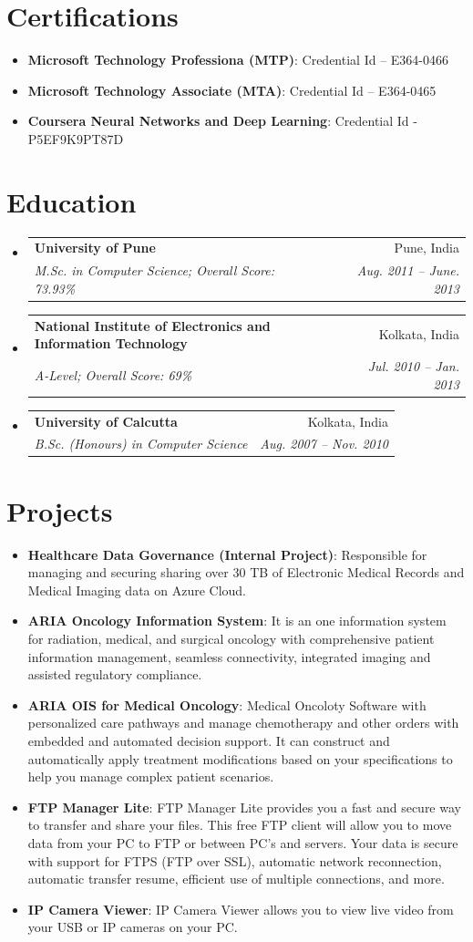 \documentclass[letterpaper,11pt]{article}
\makeatletter
\newcommand{\resumeItem}[2]{
  \item\small{ 
    \textbf{ #1}{: #2 \vspace{-2pt}}
  }
}
\newcommand{\resumeSubheading}[4]{
  \vspace{-1pt}\item
    \begin{tabular*}{0.97\textwidth}[t]{l@{\extracolsep{\fill}}r}
      \textbf{#1} & #2 \\
      \textit{\small#3} & \textit{\small #4} \\
    \end{tabular*}\vspace{-5pt}
}
\newcommand{\resumeSubItem}[2]{\resumeItem{#1}{#2}\vspace{-4pt}}
\newcommand{\resumeSubHeadingListStart}{\begin{itemize}[leftmargin=*]}
\newcommand{\resumeSubHeadingListEnd}{\end{itemize}}
\makeatother
\begin{document}
\section{Certifications}
  \resumeSubHeadingListStart
    \resumeSubItem{Microsoft Technology Professiona (MTP)}
      {Credential Id – E364-0466}
    \resumeSubItem{Microsoft Technology Associate (MTA)}
      {Credential Id – E364-0465}
    \resumeSubItem{Coursera Neural Networks and Deep Learning}
      {Credential Id - P5EF9K9PT87D}
  \resumeSubHeadingListEnd
  
\section{Education}
  \resumeSubHeadingListStart
    \resumeSubheading
      {University of Pune}{Pune, India}
      {M.Sc. in Computer Science;  Overall Score: 73.93\%}{Aug. 2011 -- June. 2013}
    \resumeSubheading
      {National Institute of Electronics and Information Technology}{Kolkata, India}
      {A-Level;  Overall Score: 69\% }{Jul. 2010 -- Jan. 2013}
    \resumeSubheading
      {University of Calcutta}{Kolkata, India}
      {B.Sc. (Honours) in Computer Science}{Aug. 2007 -- Nov. 2010}
  \resumeSubHeadingListEnd


\section{Projects}
  \resumeSubHeadingListStart
    \resumeSubItem{Healthcare Data Governance (Internal Project)}
      {Responsible for managing and securing sharing over 30 TB of Electronic Medical Records and Medical Imaging data on Azure Cloud.}
    \resumeSubItem{ARIA Oncology Information System}
      {It is an one information system for radiation, medical, and surgical oncology with comprehensive patient information management, seamless connectivity, integrated imaging and assisted regulatory compliance.}
    \resumeSubItem{ARIA OIS for Medical Oncology}
      {Medical Oncoloty Software with personalized care pathways and manage chemotherapy and other orders with embedded and automated decision support. It can construct and automatically apply treatment modifications based on your specifications to help you manage complex patient scenarios.}
    \resumeSubItem{FTP Manager Lite}
      {FTP Manager Lite provides you a fast and secure way to transfer and share your files.  This free FTP client will allow you to move data from your PC to FTP or between PC's and servers.  Your data is secure with support for FTPS (FTP over SSL), automatic network reconnection, automatic transfer resume, efficient use of multiple connections, and more.}
    \resumeSubItem{IP Camera Viewer}
      {IP Camera Viewer allows you to view live video from your USB or IP cameras on your PC.}
  \resumeSubHeadingListEnd
\end{document}

